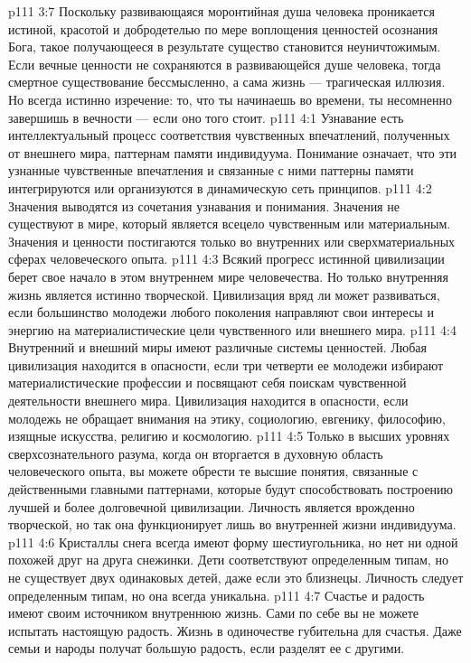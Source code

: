 \vs p111 3:7 Поскольку развивающаяся моронтийная душа человека проникается истиной, красотой и добродетелью по мере воплощения ценностей осознания Бога, такое получающееся в результате существо становится неуничтожимым. Если вечные ценности не сохраняются в развивающейся душе человека, тогда смертное существование бессмысленно, а сама жизнь --- трагическая иллюзия. Но всегда истинно изречение: то, что ты начинаешь во времени, ты несомненно завершишь в вечности --- если оно того стоит.
\vs p111 4:1 Узнавание есть интеллектуальный процесс соответствия чувственных впечатлений, полученных от внешнего мира, паттернам памяти индивидуума. Понимание означает, что эти узнанные чувственные впечатления и связанные с ними паттерны памяти интегрируются или организуются в динамическую сеть принципов.
\vs p111 4:2 Значения выводятся из сочетания узнавания и понимания. Значения не существуют в мире, который является всецело чувственным или материальным. Значения и ценности постигаются только во внутренних или сверхматериальных сферах человеческого опыта.
\vs p111 4:3 \pc Всякий прогресс истинной цивилизации берет свое начало в этом внутреннем мире человечества. Но только внутренняя жизнь является истинно творческой. Цивилизация вряд ли может развиваться, если большинство молодежи любого поколения направляют свои интересы и энергию на материалистические цели чувственного или внешнего мира.
\vs p111 4:4 Внутренний и внешний миры имеют различные системы ценностей. Любая цивилизация находится в опасности, если три четверти ее молодежи избирают материалистические профессии и посвящают себя поискам чувственной деятельности внешнего мира. Цивилизация находится в опасности, если молодежь не обращает внимания на этику, социологию, евгенику, философию, изящные искусства, религию и космологию.
\vs p111 4:5 Только в высших уровнях сверхсознательного разума, когда он вторгается в духовную область человеческого опыта, вы можете обрести те высшие понятия, связанные с действенными главными паттернами, которые будут способствовать построению лучшей и более долговечной цивилизации. Личность является врожденно творческой, но так она функционирует лишь во внутренней жизни индивидуума.
\vs p111 4:6 \pc Кристаллы снега всегда имеют форму шестиугольника, но нет ни одной похожей друг на друга снежинки. Дети соответствуют определенным типам, но не существует двух одинаковых детей, даже если это близнецы. Личность следует определенным типам, но она всегда уникальна.
\vs p111 4:7 \pc Счастье и радость имеют своим источником внутреннюю жизнь. Сами по себе вы не можете испытать настоящую радость. Жизнь в одиночестве губительна для счастья. Даже семьи и народы получат большую радость, если разделят ее с другими.
